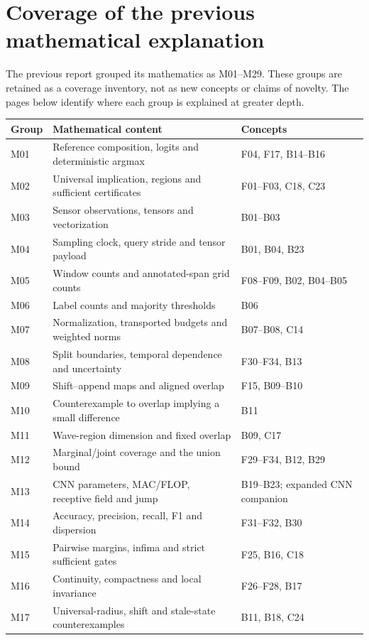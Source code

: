 \documentclass[11pt,a4paper]{article}
\newcommand{\conceptid}{Front matter}
\begin{document}
\clearpage
\renewcommand{\conceptid}{Coverage crosswalks}
\appendix
\section{Coverage of the previous mathematical explanation}
The previous report grouped its mathematics as M01--M29. These groups are
retained as a coverage inventory, not as new concepts or claims of novelty.
The pages below identify where each group is explained at greater depth.
\small
\begin{longtable}{@{}P{1.2cm}P{7.3cm}P{6.7cm}@{}}\toprule
Group & Mathematical content & Concepts\\\midrule\endhead
M01 & Reference composition, logits and deterministic argmax & F04, F17, B14--B16\\
M02 & Universal implication, regions and sufficient certificates & F01--F03, C18, C23\\
M03 & Sensor observations, tensors and vectorization & B01--B03\\
M04 & Sampling clock, query stride and tensor payload & B01, B04, B23\\
M05 & Window counts and annotated-span grid counts & F08--F09, B02, B04--B05\\
M06 & Label counts and majority thresholds & B06\\
M07 & Normalization, transported budgets and weighted norms & B07--B08, C14\\
M08 & Split boundaries, temporal dependence and uncertainty & F30--F34, B13\\
M09 & Shift--append maps and aligned overlap & F15, B09--B10\\
M10 & Counterexample to overlap implying a small difference & B11\\
M11 & Wave-region dimension and fixed overlap & B09, C17\\
M12 & Marginal/joint coverage and the union bound & F29--F34, B12, B29\\
M13 & CNN parameters, MAC/FLOP, receptive field and jump & B19--B23; expanded CNN companion\\
M14 & Accuracy, precision, recall, F1 and dispersion & F31--F32, B30\\
M15 & Pairwise margins, infima and strict sufficient gates & F25, B16, C18\\
M16 & Continuity, compactness and local invariance & F26--F28, B17\\
M17 & Universal-radius, shift and stale-state counterexamples & B11, B18, C24\\

\end{longtable}
\end{document}
